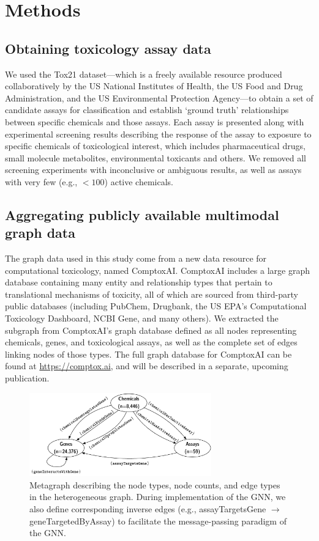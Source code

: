 \documentclass{ws-procs11x85}
\begin{document}
\section{Methods}

\subsection{Obtaining toxicology assay data}
We used the Tox21 dataset---which is a freely available resource produced collaboratively by the US National Institutes of Health, the US Food and Drug Administration, and the US Environmental Protection Agency---to obtain a set of candidate assays for classification and establish `ground truth' relationships between specific chemicals and those assays.
Each assay is presented along with experimental screening results describing the response of the assay to exposure to specific chemicals of toxicological interest, which includes pharmaceutical drugs, small molecule metabolites, environmental toxicants and others.
We removed all screening experiments with inconclusive or ambiguous results, as well as assays with very few (e.g., $<100$) active chemicals.

\subsection{Aggregating publicly available multimodal graph data}
The graph data used in this study come from a new data resource for computational toxicology, named ComptoxAI.
ComptoxAI includes a large graph database containing many entity and relationship types that pertain to translational mechanisms of toxicity, all of which are sourced from third-party public databases (including PubChem, Drugbank, the US EPA's Computational Toxicology Dashboard, NCBI Gene, and many others).
We extracted the subgraph from ComptoxAI's graph database defined as all nodes representing chemicals, genes, and toxicological assays, as well as the complete set of edges linking nodes of those types.
The full graph database for ComptoxAI can be found at \url{https://comptox.ai}, and will be described in a separate, upcoming publication.

\begin{figure}
   \centering
   \includegraphics[width=0.7\textwidth]{figures/figure1-1.pdf}
   \caption{Metagraph describing the node types, node counts, and edge types in the heterogeneous graph. During implementation of the GNN, we also define corresponding inverse edges (e.g., assayTargetsGene $\to$ geneTargetedByAssay) to facilitate the message-passing paradigm of the GNN.}\label{fig:2}
\end{figure}
\end{document}

